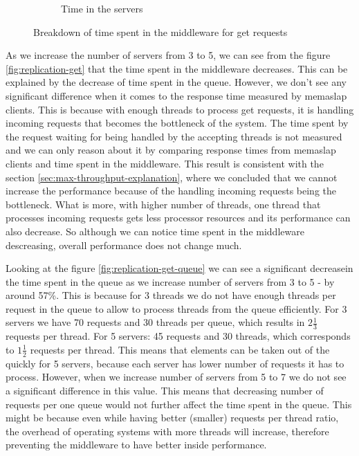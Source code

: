 \documentclass[11pt]{article}
\begin{document}
\begin{figure}
\begin{subfigure}{.5\textwidth}
	\caption{Time in the servers}
	\label{fig:replication-get-servers}
\end{subfigure}
\caption{Breakdown of time spent in the middleware for get requests}
\label{fig:replication-get-breakdown}
\end{figure}

As we increase the number of servers from 3 to 5, we can see from the figure \ref{fig:replication-get} that the time spent in the middleware decreases. This can be explained by the decrease of time spent in the queue. However, we don't see any significant difference when it comes to the response time measured by memaslap clients. This is because with enough threads to process get requests, it is handling incoming requests that becomes the bottleneck of the system. The time spent by the request waiting for being handled by the accepting threads is not measured and we can only reason about it by comparing response times from memaslap clients and time spent in the middleware. This result is consistent with the section \ref{sec:max-throughput-explanation}, where we concluded that we cannot increase the performance because of the handling incoming requests being the bottleneck. What is more, with higher number of threads, one thread that processes incoming requests gets less processor resources and its performance can also decrease. So although we can notice time spent in the middleware descreasing, overall performance does not change much. 

Looking at the figure \ref{fig:replication-get-queue} we can see a significant decreasein the time spent in the queue as we increase number of servers from 3 to 5 - by around 57\%. This is because for 3 threads we do not have enough threads per request in the queue to allow to process threads from the queue efficiently. For 3 servers we have 70 requests and 30 threads per queue, which results in $2\frac{1}{3}$ requests per thread. For 5 servers: 45 requests and 30 threads, which corresponds to $1\frac{1}{2}$ requests per thread. This means that elements can be taken out of the quickly for 5 servers, because each server has lower number of requests it has to process. However, when we increase number of servers from 5 to 7 we do not see a significant difference in this value. This means that decreasing number of requests per one queue would not further affect the time spent in the queue. This might be because even while having better (smaller) requests per thread ratio, the overhead of operating systems with more threads will increase, therefore preventing the middleware to have better inside performance.
\end{document}
